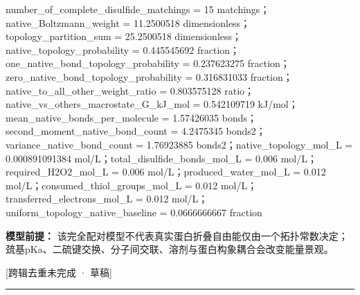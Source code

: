 \documentclass[UTF8,11pt,a4paper]{ctexart}
\begin{document}
number\_of\_complete\_disulfide\_matchings = 15 matchings；native\_Boltzmann\_weight = 11.2500518 dimensionless；topology\_partition\_sum = 25.2500518 dimensionless；native\_topology\_probability = 0.445545692 fraction；one\_native\_bond\_topology\_probability = 0.237623275 fraction；zero\_native\_bond\_topology\_probability = 0.316831033 fraction；native\_to\_all\_other\_weight\_ratio = 0.803575128 ratio；native\_vs\_others\_macrostate\_G\_kJ\_mol = 0.542109719 kJ/mol；mean\_native\_bonds\_per\_molecule = 1.57426035 bonds；second\_moment\_native\_bond\_count = 4.2475345 bonds2；variance\_native\_bond\_count = 1.76923885 bonds2；native\_topology\_mol\_L = 0.000891091384 mol/L；total\_disulfide\_bonds\_mol\_L = 0.006 mol/L；required\_H2O2\_mol\_L = 0.006 mol/L；produced\_water\_mol\_L = 0.012 mol/L；consumed\_thiol\_groups\_mol\_L = 0.012 mol/L；transferred\_electrons\_mol\_L = 0.012 mol/L；uniform\_topology\_native\_baseline = 0.0666666667 fraction\par
\noindent\textbf{模型前提：}
该完全配对模型不代表真实蛋白折叠自由能仅由一个拓扑常数决定；巯基pKa、二硫键交换、分子间交联、溶剂与蛋白构象耦合会改变能量景观。\par
\noindent\textcolor{red!65!black}{[跨辑去重未完成 · 草稿]} \par
\medskip\hrule\medskip
{}
\end{document}
